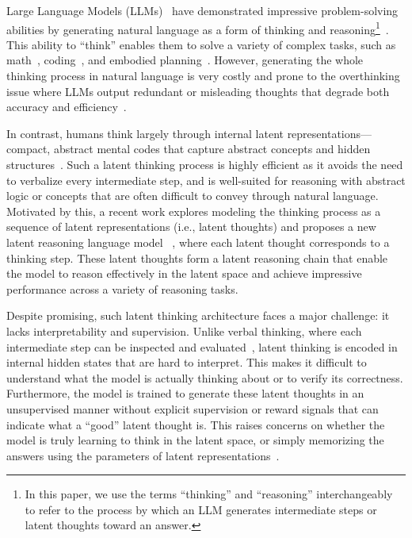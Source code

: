 \documentclass{article} %
\begin{document}

Large Language Models (LLMs)~\citep{openai2023gpt,bai2023qwen,touvron2023llama,team2023gemini} have demonstrated impressive problem-solving abilities by generating natural language as a form of thinking and reasoning\footnote{In this paper, we use the terms ``thinking'' and ``reasoning'' interchangeably to refer to the process by which an LLM generates intermediate steps or latent thoughts toward an answer.}~\citep{wei2022chain,kojima2022large,yao2023tree}.
%
This ability to ``think'' enables them to solve a variety of complex tasks, such as math~\citep{lightman2024lets,gao2023pal}, coding~\citep{li2022competition,nijkamp2023codegen}, and embodied planning~\citep{shinn2023reflexion,hao2023reasoning}.
%
However, generating the whole thinking process in natural language is very costly and prone to the overthinking issue where LLMs output redundant or misleading thoughts that degrade both accuracy and efficiency~\citep{sui2025stop,chen2025do}.

In contrast, humans think largely through internal latent representations---compact, abstract mental codes that capture abstract concepts and hidden structures~\citep{quiroga2005invariant,mishchanchuk2024hidden}.
%
Such a latent thinking process is highly efficient as it avoids the need to verbalize every intermediate step, and is well-suited for reasoning with abstract logic or concepts that are often difficult to convey through natural language. 
%
Motivated by this, a recent work explores modeling the thinking process as a sequence of latent representations (i.e., latent thoughts) and proposes a new latent reasoning language model \LRLM~\citep{geiping2025scaling}, where each latent thought corresponds to a thinking step. 
%
These latent thoughts form a latent reasoning chain that enable the model to reason effectively in the latent space and achieve impressive performance across a variety of reasoning tasks.

Despite promising, such latent thinking architecture faces a major challenge: it lacks interpretability and supervision. Unlike verbal thinking, where each intermediate step can be inspected and evaluated~\citep{wang-etal-2024-math}, latent thinking is encoded in internal hidden states that are hard to interpret. 
%
This makes it difficult to understand what the model is actually thinking about or to verify its correctness. Furthermore, the model is trained to generate these latent thoughts in an unsupervised manner without explicit supervision or reward signals that can indicate what a ``good'' latent thought is. This raises concerns on whether the model is truly learning to think in the latent space, or simply memorizing the answers using the parameters of latent representations~\citep{wang2025generalization}.
\end{document}
